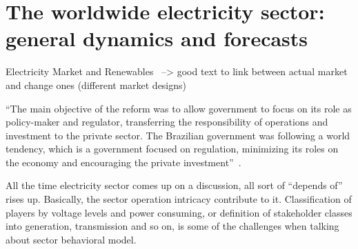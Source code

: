 

\section{The worldwide electricity sector: general dynamics and forecasts}
\label{sec:world-sector}


Electricity Market and Renewables~\cite{erik2017} --> good text to link between actual market and change ones (different market designs)

``The main objective of the reform was to allow government to focus on its role as policy-maker and regulator, transferring the responsibility of operations and investment to the private sector. The Brazilian government was following a world tendency, which is a government focused on regulation, minimizing its roles on the economy and encouraging the private investment''~\cite{lud2007}.



All the time electricity sector comes up on a discussion, all sort of ``depends of'' rises up.
Basically, the sector operation intricacy contribute to it.
Classification of players by voltage levels and power consuming, or definition of stakeholder classes into generation, transmission and so on, is some of the challenges when talking about sector behavioral model.


